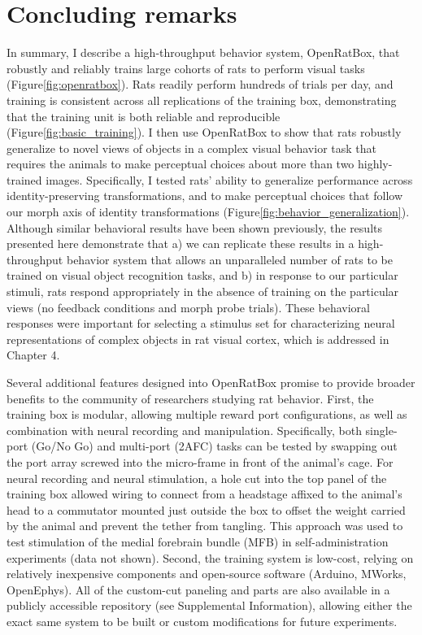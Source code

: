 \section{Concluding remarks}
In summary, I describe a high-throughput behavior system, OpenRatBox, that robustly and reliably trains large cohorts of rats to perform visual tasks (Figure\ref{fig:openratbox}). Rats readily perform hundreds of trials per day, and training is consistent across all replications of the training box, demonstrating that the training unit is both reliable and reproducible (Figure\ref{fig:basic_training}). I then use OpenRatBox to show that rats robustly generalize to novel views of objects in a complex visual behavior task that requires the animals to make perceptual choices about more than two highly-trained images. Specifically, I tested rats' ability to generalize performance across identity-preserving transformations, and to make perceptual choices that follow our morph axis of identity transformations (Figure\ref{fig:behavior_generalization}). Although similar behavioral results have been shown previously\cite{Zoccolan2009, Tafazoli2012, Vermaercke2012}, the results presented here demonstrate that a) we can replicate these results in a high-throughput behavior system that allows an unparalleled number of rats to be trained on visual object recognition tasks, and b) in response to our particular stimuli, rats respond appropriately in the absence of training on the particular views (no feedback conditions and morph probe trials). These behavioral responses were important for selecting a stimulus set for characterizing neural representations of complex objects in rat visual cortex, which is addressed in Chapter 4. 

Several additional features designed into OpenRatBox promise to provide broader benefits to the community of researchers studying rat behavior. First, the training box is modular, allowing multiple reward port configurations, as well as combination with neural recording and manipulation. Specifically, both single-port (Go/No Go) and multi-port (2AFC) tasks can be tested by swapping out the port array screwed into the micro-frame in front of the animal's cage. For neural recording and neural stimulation, a hole cut into the top panel of the training box allowed wiring to connect from a headstage affixed to the animal's head to a commutator mounted just outside the box to offset the weight carried by the animal and prevent the tether from tangling. This approach was used to test stimulation of the medial forebrain bundle (MFB) in self-administration experiments (data not shown). Second, the training system is low-cost, relying on relatively inexpensive components and open-source software (Arduino, MWorks, OpenEphys). All of the custom-cut paneling and parts are also available in a publicly accessible repository (see Supplemental Information), allowing either the exact same system to be built or custom modifications for future experiments. 

